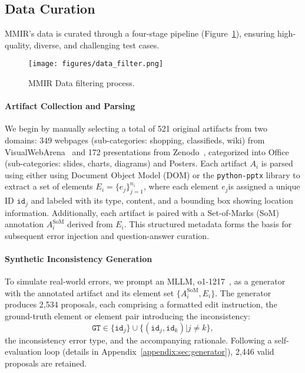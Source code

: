 \subsection{Data Curation}

MMIR’s data is curated through a four-stage pipeline (Figure~\ref{fig:data_filter}), ensuring high-quality, diverse, and challenging test cases.

\begin{figure}[htbp]
\setlength\tabcolsep{0pt}
\setlength{\abovecaptionskip}{0.1cm}
    \centering
    \texttt{[image: figures/data\_filter.png]}
    \caption{MMIR Data filtering process.}
    \label{fig:data_filter}
\end{figure}

\paragraph{Artifact Collection and Parsing}
We begin by manually selecting a total of 521 original artifacts from two domains: 349 webpages (sub-categories: shopping, classifieds, wiki) from VisualWebArena~\cite{Koh2024VisualWebArenaEM} and 172 presentations from Zenodo~\cite{zenodo}, categorized into Office (sub-categories: slides, charts, diagrams) and Posters. 
Each artifact $A_i$ is parsed using either using Document Object Model (DOM) or the \texttt{python-pptx} library to extract a set of elements $E_i = \{e_j\}_{j=1}^{n_i}$, where each element $e_j$is assigned a unique ID \(\mathtt{id}_j\) and labeled with its type, content, and a bounding box showing location information. Additionally, each artifact is paired with a Set-of-Marks (SoM) annotation $A_{i}^{\text{SoM}}$ derived from $E_i$. This structured metadata forms the basis for subsequent error injection and question-answer curation.

\paragraph{Synthetic Inconsistency Generation}
To simulate real-world errors, we prompt an MLLM, o1-1217~\cite{openai2024gpto1card}, as a generator with the annotated artifact and its element set $\{A_{i}^{\text{SoM}}, E_i\}$.
The generator produces 2,534 proposals,
each comprising a formatted edit instruction,
the ground-truth element or element pair introducing the inconsistency:
$$\mathtt{GT} \in \{\mathtt{id}_j\} \cup \{(\mathtt{id}_j, \mathtt{id}_k) | j \neq k\},$$
the inconsistency error type, and the accompanying rationale. Following a self-evaluation loop (details in Appendix~\ref{appendix:sec:generator}), 2,446 valid proposals are retained.

